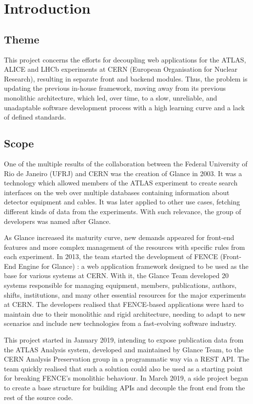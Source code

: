 \chapter{Introduction}
\label{chap1}

\section{Theme}

This project concerns the efforts for decoupling web applications for the ATLAS, ALICE and LHCb experiments at CERN (European Organisation for Nuclear Research), resulting in separate front and backend modules. Thus, the problem is updating the previous in-house framework, moving away from its previous monolithic architecture, which led, over time, to a slow, unreliable, and unadaptable software development process with a high learning curve and a lack of defined standards. 

\section{Scope}

One of the multiple results of the collaboration between the Federal University of Rio de Janeiro (UFRJ) and CERN was the creation of Glance \cite{grael-tcc} in 2003. It was a technology which allowed members of the ATLAS experiment to create search interfaces on the web over multiple databases containing information about detector equipment and cables. It was later applied to other use cases, fetching different kinds of data from the experiments. With such relevance, the group of developers was named after Glance.

As Glance increased its maturity curve, new demands appeared for front-end features and more complex management of the resources with specific rules from each experiment. In 2013, the team started the development of FENCE (Front-End Engine for Glance) \cite{lange-tcc}: a web application framework designed to be used as the base for various systems at CERN. With it, the Glance Team developed 20 systems responsible for managing equipment, members, publications, authors, shifts, institutions, and many other essential resources for the major experiments at CERN. The developers realised that FENCE-based applications were hard to maintain due to their monolithic and rigid architecture, needing to adapt to new scenarios and include new technologies from a fast-evolving software industry.

This project started in January 2019, intending to expose publication data from the ATLAS Analysis system, developed and maintained by Glance Team, to the CERN Analysis Preservation group in a programmatic way via a REST API. The team quickly realised that such a solution could also be used as a starting point for breaking FENCE’s monolithic behaviour. In March 2019, a side project began to create a base structure for building APIs and decouple the front end from the rest of the source code.

